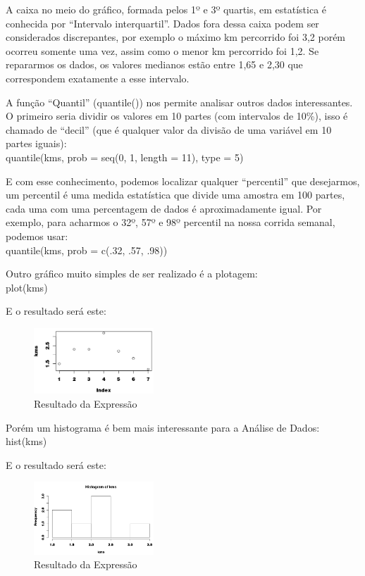 \documentclass[a4paper,11pt]{article}
\begin{document}
A caixa no meio do gráfico, formada pelos 1º e 3º quartis, em estatística é conhecida por ``Intervalo interquartil''. Dados fora dessa caixa podem ser considerados discrepantes, por exemplo o máximo km percorrido foi 3,2 porém ocorreu somente uma vez, assim como o menor km percorrido foi 1,2. Se repararmos os dados, os valores medianos estão entre 1,65 e 2,30 que correspondem exatamente a esse intervalo.

A função ``Quantil'' (quantile()) nos permite analisar outros dados interessantes. O primeiro seria dividir os valores em 10 partes (com intervalos de 10\%), isso é chamado de ``decil'' (que é qualquer valor da divisão de uma 
variável em 10 partes iguais): \\
{\ttfamily quantile(kms, prob = seq(0, 1, length = 11), type = 5)}

E com esse conhecimento, podemos localizar qualquer ``percentil'' que desejarmos, um percentil é uma medida estatística que divide uma amostra em 100 partes, cada uma com uma percentagem de dados é aproximadamente igual. Por exemplo, para acharmos o 32º, 57º e 98º percentil na nossa corrida semanal, podemos usar: \\
{\ttfamily quantile(kms, prob = c(.32, .57, .98))}

Outro gráfico muito simples de ser realizado é a plotagem: \\
{\ttfamily plot(kms)}

E o resultado será este:
\begin{figure}[H]
	\centering
	\includegraphics[width=0.4\textwidth]{imagens/grafico03.png}
	\caption{Resultado da Expressão}
\end{figure}

Porém um histograma é bem mais interessante para a Análise de Dados: \\
{\ttfamily hist(kms)}

E o resultado será este:
\begin{figure}[H]
	\centering
	\includegraphics[width=0.4\textwidth]{imagens/grafico02.png}
	\caption{Resultado da Expressão}
\end{figure}
\end{document}
